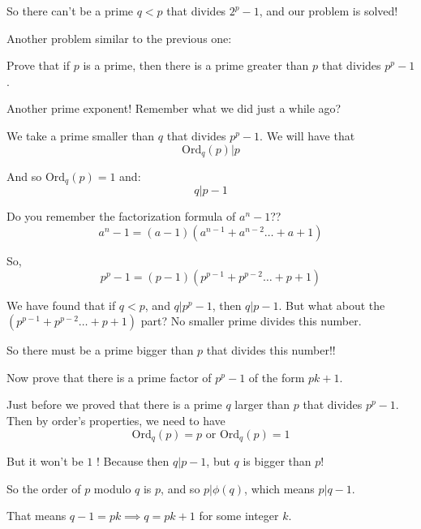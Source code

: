 \documentclass[compress]{beamer}
\newcommand{\gap}{\pause\vspace{1em}}
\begin{document}
\begin{frame}
    So there can't be a prime $q < p$ that divides $2^p-1$, and our problem is
    solved!
\end{frame}

\begin{frame}
    Another problem similar to the previous one:

    \vspace{1em}

    \textcolor{NordOrange}{Prove that if $p$ is a prime, then there is a prime
    greater than $p$ that divides $p^p-1$.}

    \gap

    Another prime exponent! Remember what we did just a while ago?

    \gap

    We take a prime smaller than $q$ that divides $p^p-1$. We will have that 
    \textcolor{NordRed}{\[\text{Ord}_q(p) | p\]}

    \pause

    And so $\text{Ord}_q(p) = 1$ and:
    \textcolor{NordRed}{\[q|p-1\]} 
\end{frame}

\begin{frame}
    Do you remember the factorization formula of $a^n-1$??
    \textcolor{NordBrightBlue}{ \[a^n-1 = (a-1)\left(a^{n-1} + a^{n-2} \dots +
    a + 1\right) \] }

    \pause

    So, 
    \[p^p-1 = \left(p-1\right) \left(p^{p-1} + p^{p-2} \dots  + p+1\right) \] 

    \pause

    We have found that if $q<p$, and $q|p^p-1$, then $q|p-1$.
    \textcolor{NordRed}{But what about the $\left(p^{p-1} + p^{p-2} \dots  +
    p+1\right)$ part?} No smaller prime divides this number. 

    \gap

    So there \textcolor{NordBrightBlue}{must be a prime bigger than $p$ that
    divides this number}!!
\end{frame}

\begin{frame}
    Now \textcolor{NordOrange}{prove that there is a prime factor of $p^p-1$
    of the form $pk+1$.}

    \gap

    Just before we proved that there is a prime $q$ larger than $p$ that
    divides $p^p-1$. Then by order's properties, we need to have
    \textcolor{NordRed}{\[\text{Ord}_q(p) = p \text{ or } \text{Ord}_q(p) = 1\]}

    \pause

    But it won't be $1$ ! \pause \textcolor{NordBrightBlue}{Because then
    $q|p-1$, but $q$ is bigger than $p$}!

    \gap

    So \textcolor{NordRed}{the order of $p$ modulo $q$ is $p$, and so
    $p|\phi(q)$}, which means $p|q-1$. 

    \gap That means \textcolor{NordBrightBlue}{$q-1 = pk \implies q=pk+1$ for
    some integer $k$}.

\end{frame}
\end{document}
